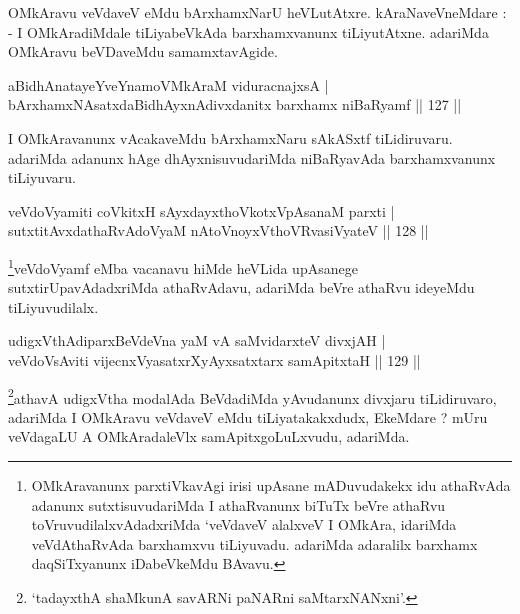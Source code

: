 \begin{artha}
OMkAravu veVdaveV eMdu bArxhamxNarU heVLutAtxre. kAraNaveVneMdare : - I OMkAradiMdale tiLiyabeVkAda barxhamxvanunx tiLiyutAtxne. adariMda OMkAravu beVDaveMdu samamxtavAgide.
\end{artha}

\begin{shl}
aBidhAnatayeYveYnamoVMkAraM viduracnajxsA  | \\
bArxhamxNAsatxdaBidhAyxnAdivxdanitx barxhamx niBaRyamf \hfill||  127 ||  
\end{shl}

\begin{artha}
I OMkAravanunx vAcakaveMdu bArxhamxNaru sAkASxtf tiLidiruvaru. adariMda adanunx hAge dhAyxnisuvudariMda niBaRyavAda barxhamxvanunx tiLiyuvaru.
\end{artha}


\begin{shl}
veVdoV\s yamiti coVkitxH sAyxdayxthoVkotxVpAsanaM parxti  | \\
sutxtitAvxdathaRvAdoV\s yaM nAtoV\s noyxV\s thoVR\s vasiVyateV \hfill||  128 ||  
\end{shl}

\begin{artha}
\footnote{OMkAravanunx parxtiVkavAgi irisi upAsane mADuvudakekx idu athaRvAda adanunx sutxtisuvudariMda I athaRvanunx biTuTx beVre athaRvu toVruvudilalxvAdadxriMda `veVdaveV alalxveV I OMkAra, idariMda veVdAthaRvAda barxhamxvu tiLiyuvadu. adariMda adaralilx barxhamx daqSiTxyanunx iDabeVkeMdu BAvavu.}veVdoV\s yamf eMba vacanavu hiMde heVLida upAsanege sutxtirUpavAdadxriMda athaRvAdavu, adariMda beVre athaRvu ideyeMdu tiLiyuvudilalx.
\end{artha}


\begin{shl}
udigxVthAdiparxBeVdeVna yaM vA saMvidarxteV divxjAH  | \\
veVdoV\s sAviti vijecnxVyasatxrXyAyxsatxtarx samApitxtaH \hfill||  129 ||  
\end{shl}

\begin{artha}
\footnote{`tadayxthA shaMkunA savARNi paNARni saMtarxNANxni'.}athavA udigxVtha modalAda BeVdadiMda yAvudanunx divxjaru tiLidiruvaro, adariMda I OMkAravu veVdaveV eMdu tiLiyatakakxdudx, EkeMdare ? mUru veVdagaLU A OMkAradaleVlx samApitxgoLuLxvudu, adariMda.
\end{artha}


